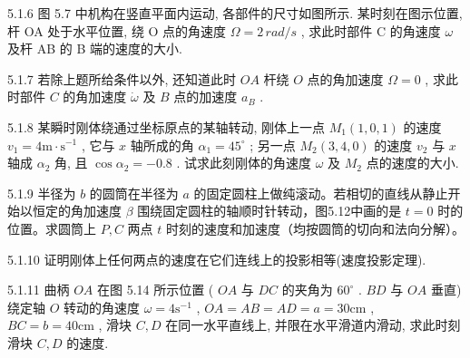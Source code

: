 \begin{problem}{5.1.6}
图 5.7 中机构在竖直平面内运动, 各部件的尺寸如图所示. 某时刻在图示位置, 杆 OA 处于水平位置, 绕 O 点的角速度 $\Omega = 2 \, rad/s$ , 求此时部件 C 的角速度 $\omega$ 及杆 AB 的 B 端的速度的大小.
\begin{center}

\end{center}
\end{problem}
\clearpage


\begin{problem}{5.1.7}
若除上题所给条件以外, 还知道此时 $OA$ 杆绕 $O$ 点的角加速度 $\Omega = 0$ , 求此时部件 $C$ 的角加速度 $\dot{\omega}$ 及 $B$ 点的加速度 $a_B$ .
\end{problem}
\clearpage


\begin{problem}{5.1.8}
某瞬时刚体绕通过坐标原点的某轴转动, 刚体上一点 $M_{1}(1,0,1)$ 的速度 $v_{1} = 4\mathrm{m}\cdot \mathrm{s}^{-1}$ , 它与 $x$ 轴所成的角 $\alpha_{1} = 45^{\circ}$ ; 另一点 $M_{2}(3,4,0)$ 的速度 $v_{2}$ 与 $x$ 轴成 $\alpha_{2}$ 角, 且 $\cos \alpha_{2} = -0.8$ . 试求此刻刚体的角速度 $\omega$ 及 $M_{2}$ 点的速度的大小.
\end{problem}
\clearpage


\begin{problem}{5.1.9}
半径为 $b$ 的圆筒在半径为 $a$ 的固定圆柱上做纯滚动。若相切的直线从静止开始以恒定的角加速度 $\beta$ 围绕固定圆柱的轴顺时针转动，图5.12中画的是 $t = 0$ 时的位置。求圆筒上 $P, C$ 两点 $t$ 时刻的速度和加速度（均按圆筒的切向和法向分解）。
\begin{center}

\end{center}
\begin{center}

\end{center}
\end{problem}
\clearpage


\begin{problem}{5.1.10}
证明刚体上任何两点的速度在它们连线上的投影相等(速度投影定理).
\end{problem}
\clearpage


\begin{problem}{5.1.11}
曲柄 $OA$ 在图 5.14 所示位置 ( $OA$ 与 $DC$ 的夹角为 $60^{\circ}$ . $BD$ 与 $OA$ 垂直) 绕定轴 $O$ 转动的角速度 $\omega = 4\mathrm{s}^{-1}$ , $OA = AB = AD = a = 30\mathrm{cm}$ , $BC = b = 40\mathrm{cm}$ , 滑块 $C, D$ 在同一水平直线上, 并限在水平滑道内滑动, 求此时刻滑块 $C, D$ 的速度.
\begin{center}

\end{center}
\begin{center}

\end{center}
\end{problem}
\clearpage



